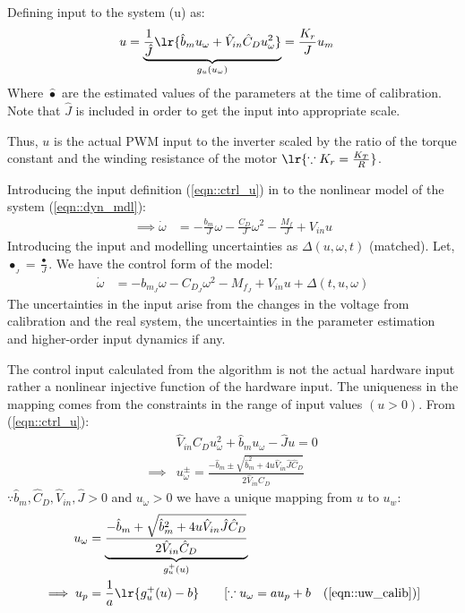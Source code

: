 Defining input to the system (u) as:
\begin{align}
    u &= \underbrace{\frac{1}{\hat J}\lr{\hat b_m u_\omega + \hat V_{in} \hat C_D u_\omega ^2}}_{g_u(u_\omega)} = \frac{K_r}{J} u_m  \label{eqn::ctrl_u}
\end{align}
Where $\hat \bullet$ are the estimated values of the parameters at the time of
calibration. Note that $\hat J$ is included in order to get the input into
appropriate scale.

Thus, $u$ is the actual PWM input to the inverter scaled by the ratio of the
torque constant and the winding resistance of the motor $\lr{\because K_r =
\frac{K_T}{R}}$.

Introducing the input definition (\ref{eqn::ctrl_u}) in to the nonlinear model
of the system (\ref{eqn::dyn_mdl}):
\begin{align*}
    \implies \dot \omega  &= -\frac{b_m}{J} \omega - \frac{C_D}{J} \omega^2 - \frac{M_f}{J} + V_{in} u
\end{align*}
Introducing the input and modelling uncertainties as $\Delta(u, \omega, t)$ (matched). Let,
$\bullet_{_J} = \frac{\bullet}{J}$. We have the control form of the model:
\begin{align}
   \dot \omega &= -b_{m_J} \omega - C_{D_J} \omega^2 - M_{f_J} + V_{in} u + \Delta(t, u, \omega) \label{eqn::ctrl_form}
\end{align}
The uncertainties in the input arise from the changes in the voltage from
calibration and the real system, the uncertainties in the parameter estimation
and higher-order input dynamics if any.

The control input calculated from the algorithm is not the actual hardware
input rather a nonlinear injective function of the hardware input. The
uniqueness in the mapping comes from the constraints in the range of input
values $(u > 0)$. From (\ref{eqn::ctrl_u}):
\begin{align*}
    &\hat V_{in} \hat C_D u_{\omega}^2 + \hat b_m u_\omega - \hat J u = 0\\
    \implies& u^{\pm}_\omega = \frac{-\hat b_m \pm \sqrt{\hat b_m ^2 + 4u \hat V_{in} \hat J \hat C_D}}{2 \hat V_{in} C_D}
\end{align*}
$\because \hat b_m, \hat C_D, \hat V_{in}, \hat J > 0 $ and $u_\omega > 0$ we have a unique mapping from $u$ to $u_w$:
\begin{align}
    u_\omega &= \underbrace{\frac{-\hat b_m + \sqrt{\hat b_m ^2 + 4u \hat V_{in} \hat J \hat C_D}}{2 \hat V_{in} \hat C_D}}_{g_u^+(u)}
    \label{eqn::u2uw}\\
    \implies u_p &= \frac{1}{a} \lr{g_u^+(u) - b} \qquad [\because u_\omega = a u_p + b \quad (\ref{eqn::uw_calib})]
\end{align}
